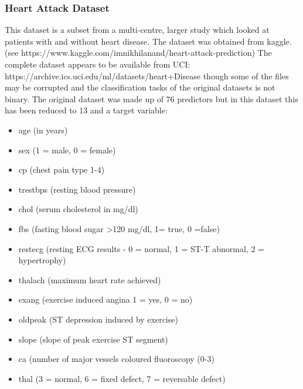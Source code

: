 \subsubsection{Heart Attack Dataset}
This dataset is a subset from a multi-centre, larger study which looked at patients with and without heart disease. The dataset was obtained from kaggle.\newline 
(see https://www.kaggle.com/imnikhilanand/heart-attack-prediction) \newline
The complete dataset appears to be available from UCI:\newline
https://archive.ics.uci.edu/ml/datasets/heart+Disease \newline 
though some of the files may be corrupted and the classification tasks of the original datasets is not binary.
The original dataset was made up of 76 predictors but in this dataset this has been reduced to 13 and a target variable:
\begin{itemize}
    \item age (in years)
    \item sex (1 = male, 0 = female) 
    \item cp (chest pain type 1-4)
    \item trestbps (resting blood pressure)
    \item chol (serum cholesterol in mg/dl) 
    \item fbs (fasting blood sugar >120 mg/dl, 1= true, 0 =false) 
    \item restecg (resting ECG results - 0 = normal, 1 = ST-T abnormal, 2 = hypertrophy)
    \item thalach (maximum heart rate achieved)
    \item exang (exercise induced angina 1 = yes, 0 = no)
    \item oldpeak (ST depression induced by exercise)
    \item slope (slope of peak exercise ST segment)
    \item ca (number of major vessels coloured fluoroscopy (0-3) 
    \item thal (3 = normal, 6 = fixed defect, 7 = reversable defect) 
\end{itemize}

